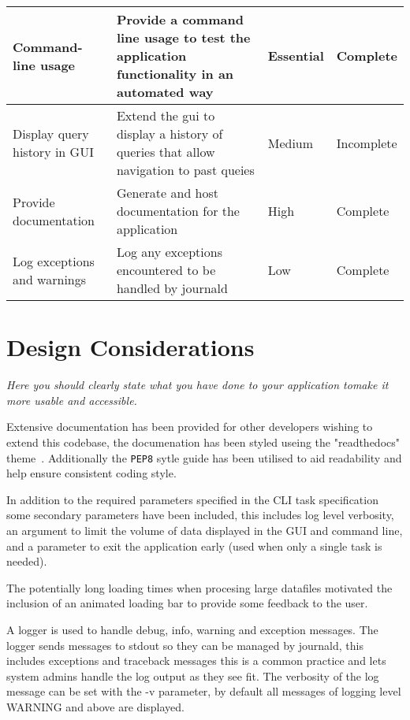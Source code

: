 \documentclass[11pt]{article}
\newcommand{\code}[1]{\colorbox{light-gray}{\texttt{#1}}}
\begin{document}
\begin{center}
\begin{longtable}{|p{3cm}|p{7cm}|l|p{2cm}|}
        \hline
        Command-line usage & Provide a command line usage to test the application functionality in an automated way & \textbf{Essential} & Complete \\
        \hline
        Display query history in GUI & Extend the gui to display a history of queries that allow navigation to past queies & Medium & Incomplete \\
        \hline
        Provide documentation & Generate and host documentation for the application & High & Complete \\ 
        \hline
        Log exceptions and warnings & Log any exceptions encountered to be handled by journald & Low & Complete \\
        \hline

    \end{longtable}
\end{center}


\section{Design Considerations}
\emph{Here you should clearly state what you have done to your application tomake it more usable and accessible.}

Extensive documentation has been provided for other developers wishing to extend this codebase, the documenation has been styled useing the "readthedocs" theme~\autocite{HomeReadDocs}. Additionally the \code{PEP8} sytle guide has been utilised to aid readability and help ensure consistent coding style. 

In addition to the required parameters specified in the CLI task specification some secondary parameters have been included, this includes log level verbosity, an argument to limit the volume of data displayed in the GUI and command line, and a parameter to exit the application early (used when only a single task is needed).

The potentially long loading times when procesing large datafiles motivated the inclusion of an animated loading bar to provide some feedback to the user.

A logger is used to handle debug, info, warning and exception messages. The logger sends messages to stdout so they can be managed by journald, this includes exceptions and traceback messages this is a common practice and lets system admins handle the log output as they see fit. The verbosity of the log message can be set with the -v parameter, by default all messages of logging level WARNING and above are displayed.
\end{document}
